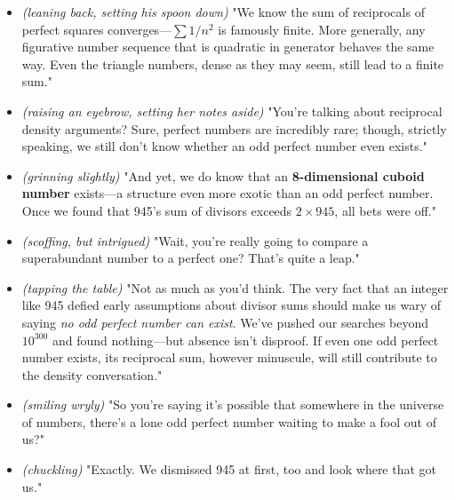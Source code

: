 \bigskip

\begin{itemize}[leftmargin=1.5cm]

\item[Jovannah:] \textit{(leaning back, setting his spoon down)} "We know the sum of reciprocals of perfect squares converges—\(\sum 1/n^2\) is famously finite. More generally, any figurative number sequence that is quadratic in generator behaves the same way. Even the triangle numbers, dense as they may seem, still lead to a finite sum."

\item[Celiac:] \textit{(raising an eyebrow, setting her notes aside)} "You’re talking about reciprocal density arguments? Sure, perfect numbers are incredibly rare; though, strictly speaking, we still don't know whether an odd perfect number even exists."

\item[Jovannah:] \textit{(grinning slightly)} "And yet, we do know that an \textbf{8-dimensional cuboid number} exists—a structure even more exotic than an odd perfect number. Once we found that 945’s sum of divisors exceeds \(2 \times 945\), all bets were off."

\item[Celiac:] \textit{(scoffing, but intrigued)} "Wait, you’re really going to compare a superabundant number to a perfect one? That’s quite a leap."

\item[Jovannah:] \textit{(tapping the table)} "Not as much as you'd think. The very fact that an integer like 945 defied early assumptions about divisor sums should make us wary of saying \textit{no odd perfect number can exist}. We’ve pushed our searches beyond \(10^{300}\) and found nothing—but absence isn’t disproof. If even one odd perfect number exists, its reciprocal sum, however minuscule, will still contribute to the density conversation."

\item[Celiac:] \textit{(smiling wryly)} "So you’re saying it’s possible that somewhere in the universe of numbers, there's a lone odd perfect number waiting to make a fool out of us?"

\item[Jovannah:] \textit{(chuckling)} "Exactly. We dismissed 945 at first, too and look where that got us."

\end{itemize}

\newpage











